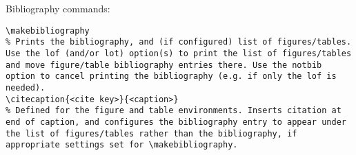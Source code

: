 Bibliography commands:
\begin{verbatim}
\makebibliography
% Prints the bibliography, and (if configured) list of figures/tables. Use the lof (and/or lot) option(s) to print the list of figures/tables and move figure/table bibliography entries there. Use the notbib option to cancel printing the bibliography (e.g. if only the lof is needed).
\citecaption{<cite key>}{<caption>}
% Defined for the figure and table environments. Inserts citation at end of caption, and configures the bibliography entry to appear under the list of figures/tables rather than the bibliography, if appropriate settings set for \makebibliography.
\end{verbatim}

\begin{comment}

\clearpage
\subsection{subsection 1}

\section{Test appendix 2}

\section{Test appendix 3}
\clearpage
\subsection{subsection 1}
\clearpage
\subsection{subsection 2}
\clearpage

\end{comment}
